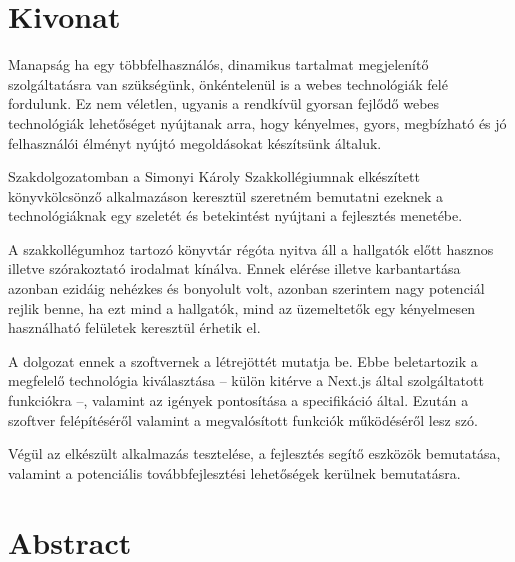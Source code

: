 \setcounter{page}{1}

\selecthungarian

\chapter*{Kivonat}

Manapság ha egy többfelhasználós, dinamikus tartalmat megjelenítő szolgáltatásra van szükségünk, önkéntelenül is a webes technológiák
felé fordulunk. Ez nem véletlen, ugyanis a rendkívül gyorsan fejlődő webes technológiák lehetőséget nyújtanak
arra, hogy kényelmes, gyors, megbízható és jó felhasználói élményt nyújtó megoldásokat készítsünk általuk.

Szakdolgozatomban a Simonyi Károly Szakkollégiumnak elkészített könyvkölcsönző alkalmazáson keresztül szeretném bemutatni
ezeknek a technológiáknak egy szeletét és betekintést nyújtani a fejlesztés menetébe.

A szakkollégumhoz tartozó könyvtár régóta nyitva áll a hallgatók előtt hasznos illetve szórakoztató irodalmat kínálva.
Ennek elérése illetve karbantartása azonban ezidáig nehézkes és bonyolult volt, azonban szerintem nagy potenciál rejlik benne,
ha ezt mind a hallgatók, mind az üzemeltetők egy kényelmesen használható felületek keresztül érhetik el.

A dolgozat ennek a szoftvernek a létrejöttét mutatja be. Ebbe beletartozik a megfelelő technológia kiválasztása -- külön kitérve a
Next.js által szolgáltatott funkciókra --, valamint az igények pontosítása a specifikáció által.
Ezután a szoftver felépítéséről valamint a megvalósított funkciók működéséről lesz szó.

Végül az elkészült alkalmazás tesztelése, a fejlesztés segítő eszközök bemutatása, valamint a potenciális továbbfejlesztési
lehetőségek kerülnek bemutatásra.


\vfill
\selectenglish


\chapter*{Abstract}


